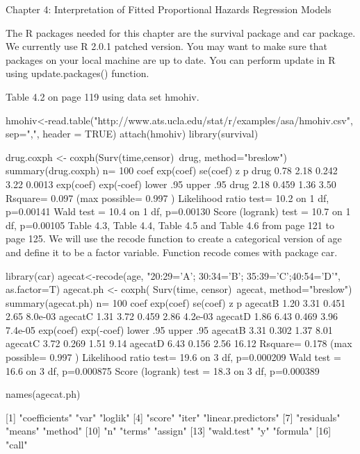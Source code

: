 Chapter 4: Interpretation of Fitted Proportional Hazards Regression Models

The R packages needed for this chapter are the survival package and car package. We currently use R 2.0.1 patched version. You may want to make sure that packages on your local machine are up to date. You can perform update in R using update.packages() function.

Table 4.2 on page 119 using data set hmohiv.

hmohiv<-read.table("http://www.ats.ucla.edu/stat/r/examples/asa/hmohiv.csv", sep=",", header = TRUE)
attach(hmohiv)
library(survival)

drug.coxph <- coxph(Surv(time,censor)~drug, method="breslow")
summary(drug.coxph)
  n= 100 
     coef exp(coef) se(coef)    z      p
drug 0.78      2.18    0.242 3.22 0.0013
     exp(coef) exp(-coef) lower .95 upper .95
drug      2.18      0.459      1.36      3.50
Rsquare= 0.097   (max possible= 0.997 )
Likelihood ratio test= 10.2  on 1 df,   p=0.00141
Wald test            = 10.4  on 1 df,   p=0.00130
Score (logrank) test = 10.7  on 1 df,   p=0.00105
Table 4.3, Table 4.4, Table 4.5 and Table 4.6 from page 121 to page 125. We will use the recode function to create a categorical version of age and define it to be a factor variable. Function recode comes with package car.

library(car)
agecat<-recode(age, "20:29='A'; 30:34='B'; 35:39='C';40:54='D'", as.factor=T)
agecat.ph <- coxph( Surv(time, censor)~agecat, method="breslow")
summary(agecat.ph) 
  n= 100 
        coef exp(coef) se(coef)    z       p
agecatB 1.20      3.31    0.451 2.65 8.0e-03
agecatC 1.31      3.72    0.459 2.86 4.2e-03
agecatD 1.86      6.43    0.469 3.96 7.4e-05
        exp(coef) exp(-coef) lower .95 upper .95
agecatB      3.31      0.302      1.37      8.01
agecatC      3.72      0.269      1.51      9.14
agecatD      6.43      0.156      2.56     16.12
Rsquare= 0.178   (max possible= 0.997 )
Likelihood ratio test= 19.6  on 3 df,   p=0.000209
Wald test            = 16.6  on 3 df,   p=0.000875
Score (logrank) test = 18.3  on 3 df,   p=0.000389

names(agecat.ph)

 [1] "coefficients"      "var"               "loglik"           
 [4] "score"             "iter"              "linear.predictors"
 [7] "residuals"         "means"             "method"           
[10] "n"                 "terms"             "assign"           
[13] "wald.test"         "y"                 "formula"          
[16] "call"             

